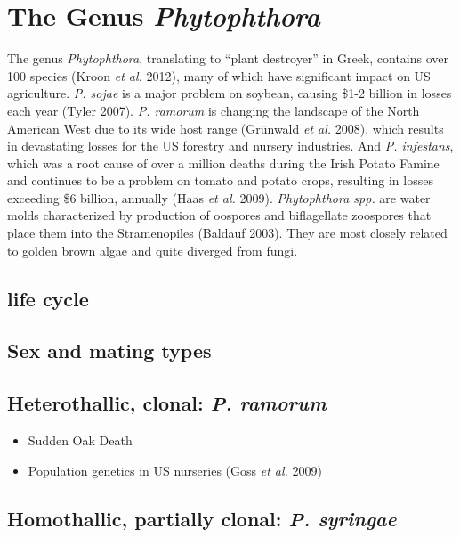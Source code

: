 \documentclass[double,12pt]{beavtex}
\providecommand{\tightlist}{%
  \setlength{\itemsep}{0pt}\setlength{\parskip}{0pt}}
\begin{document}
  \section{\texorpdfstring{The Genus
  \emph{Phytophthora}}{The Genus Phytophthora}}\label{the-genus-phytophthora}
  
  The genus \emph{Phytophthora}, translating to ``plant destroyer'' in
  Greek, contains over 100 species (Kroon \emph{et al.} 2012), many of
  which have significant impact on US agriculture. \emph{P. sojae} is a
  major problem on soybean, causing \$1-2 billion in losses each year
  (Tyler 2007). \emph{P. ramorum} is changing the landscape of the North
  American West due to its wide host range (Grünwald \emph{et al.} 2008),
  which results in devastating losses for the US forestry and nursery
  industries. And \emph{P. infestans}, which was a root cause of over a
  million deaths during the Irish Potato Famine and continues to be a
  problem on tomato and potato crops, resulting in losses exceeding \$6
  billion, annually (Haas \emph{et al.} 2009). \emph{Phytophthora spp.}
  are water molds characterized by production of oospores and biflagellate
  zoospores that place them into the Stramenopiles (Baldauf 2003). They
  are most closely related to golden brown algae and quite diverged from
  fungi.
  
  \subsection{life cycle}\label{life-cycle}
  
  \subsection{Sex and mating types}\label{sex-and-mating-types}
  
  \subsection{\texorpdfstring{Heterothallic, clonal: \emph{P.
  ramorum}}{Heterothallic, clonal: P. ramorum}}\label{heterothallic-clonal-p.-ramorum}
  
  \begin{itemize}
  \tightlist
  \item
    Sudden Oak Death
  \item
    Population genetics in US nurseries (Goss \emph{et al.} 2009)
  \end{itemize}
  
  \subsection{\texorpdfstring{Homothallic, partially clonal: \emph{P.
  syringae}}{Homothallic, partially clonal: P. syringae}}\label{homothallic-partially-clonal-p.-syringae}
  
\end{document}
